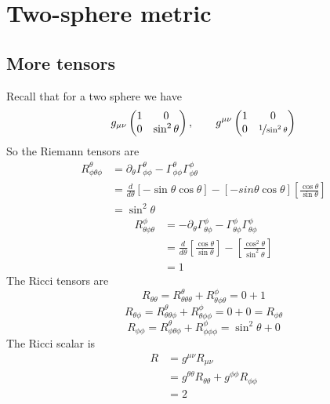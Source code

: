 \documentclass{article}
\begin{document}
	\pagebreak
	\section{Two-sphere metric}
		\subsection{More tensors}
		Recall that for a two sphere we have
		$$ g_{\mu\nu}\begin{pmatrix}
			1 & 0 \\ 0 & \sin^2 \theta
		\end{pmatrix}, \quad\quad g^{\mu\nu} \begin{pmatrix}
		1 & 0 \\ 0 & \nicefrac1{\sin^2 \theta}
	\end{pmatrix} $$
		So the Riemann tensors are
		\begin{align*}
			R_{\phi\theta\phi}^{\theta} &= \partial_\theta \Gamma_{\phi\phi}^{\theta} - \Gamma_{\phi\phi}^\theta \Gamma_{\phi\theta}^\phi\\ 
			&= \frac{d}{d\theta} \left[-\sin \theta \cos \theta \right] - \left[ -sin \theta \cos \theta\right] \left[\frac{\cos\theta}{\sin \theta}\right] \\
			&=\sin^2 \theta 
		\end{align*}
		\begin{align*}
			R_{\theta\phi\theta}^{\phi} &= -\partial_\theta \Gamma_{\theta\phi}^{\phi} - \Gamma_{\theta\phi}^\phi \Gamma_{\theta\phi}^\phi\\ 
			&= \frac{d}{d\theta} \left[\frac{\cos\theta}{\sin\theta} \right] - \left[\frac{\cos^2\theta}{\sin^2 \theta}\right] \\
			&=1
		\end{align*}
		The Ricci tensors are
		$$ R_{\theta\theta} = R_{\theta\theta\theta}^\theta + R_{\theta\phi\theta}^\phi = 0 +1$$
		$$ R_{\theta\phi} = R_{\theta\theta\phi}^\theta + R_{\theta\phi\phi}^\phi = 0 + 0 = R_{\phi\theta}$$
		$$ R_{\phi\phi} = R_{\phi\theta\phi}^\theta + R_{\phi\phi\phi}^\phi = \sin^2\theta + 0$$
		The Ricci scalar is
		\begin{align*}
			R &= g^{\mu\nu} R_{\mu\nu} \\
			&= g^{\theta \theta} R_{\theta \theta} + g^{\phi\phi} R_{\phi\phi} \\
			&= 2
		\end{align*}
	\pagebreak
\end{document}
